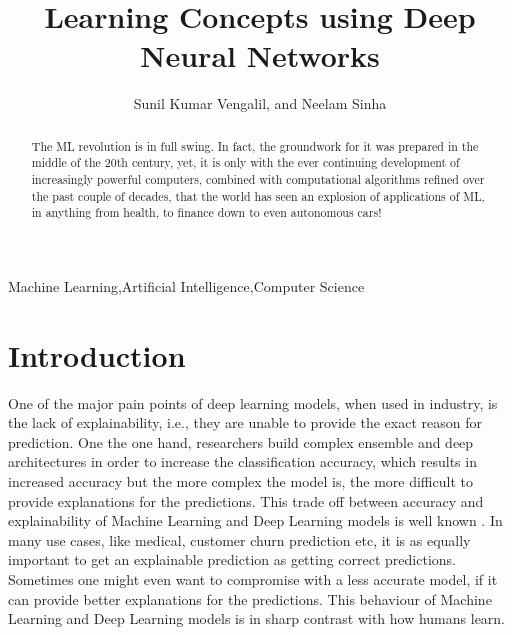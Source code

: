 \documentclass{JMLFS}
\begin{document}
\title{Learning Concepts using Deep Neural Networks}

\author{Sunil Kumar Vengalil, and Neelam Sinha}
\address{$^1$International Institute of Information Technology Bangalore}
\address{$^2$International Institute of Information Technology Bangalore}

\begin{abstract}
The ML revolution is in full swing. In fact, the groundwork for it was prepared in the middle of the 20th century, yet, it is only with the ever continuing development of increasingly powerful computers, combined with computational algorithms refined over the past couple of decades, that the world has seen an explosion of applications of ML, in anything from health, to finance down to even autonomous cars!
\end{abstract}

\maketitle

\begin{keyword}
Machine Learning\sep Artificial Intelligence\sep Computer Science
\end{keyword}

\section{Introduction}
One of the major pain points of deep learning models, when used in industry, is the lack of explainability, i.e., they are unable to provide the exact reason for prediction.
One the one hand, researchers build complex ensemble and deep architectures in order to increase the classification accuracy, which results in increased accuracy but the more complex the model is, the more difficult to provide explanations for the predictions.
This trade off between accuracy and explainability of Machine Learning and Deep Learning models is well known \cite{wu2021}.
In many use cases, like medical, customer churn prediction etc, it is as equally important to get an explainable prediction as getting correct predictions.
Sometimes one might even want to compromise with a less accurate model, if it can provide better explanations for the predictions.
This behaviour of Machine Learning and Deep Learning models is in sharp contrast with how humans learn.
\end{document}
